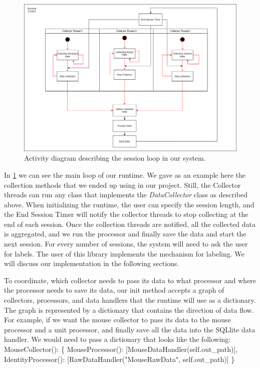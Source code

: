 \begin{itemize}
    \begin{figure}[htp]
        \centering
        \includegraphics[width=14cm]{figures/sys_activity}   
        \caption{Activity diagram describing the session loop in our system.}
        \label{fig:sys_activity} 
    \end{figure}


    In \ref{fig:sys_activity} we can see the main loop of our runtime. We gave as an example here the collection methods that we ended up using in 
    our project. Still, the Collector threads can run any class that implements the \textit{DataCollector} class as described above. 
    When initializing the runtime, the user can specify the session length, and the End Session Timer will notify the collector threads to 
    stop collecting at the end of each session. Once the collection threads are notified, all the collected data is aggregated, and we run the 
    processor and finally save the data and start the next session. For every number of sessions, the system will need to ask the user for labels. 
    The user of this library implements the mechanism for labeling. We will discuss our implementation in the following sections.


    To coordinate, which collector needs to pass its data to what processor and where the processor needs to save its data, 
    our init method accepts a graph of collectors, processors, and data handlers that the runtime will use as a dictionary. 
    The graph is represented by a dictionary that contains the direction of data flow. For example, 
    if we want the mouse collector to pass its data to the mouse processor and a unit processor, and finally save all the data into the SQLlite data handler. 
    We would need to pass a dictionary that looks like the following:
    MouseCollector(): \{ MouseProcessor(): [MouseDataHandler(self.out\_path)], IdentityProcessor(): [RawDataHandler("MouseRawData", self.out\_path)] \}

 \end{itemize}

